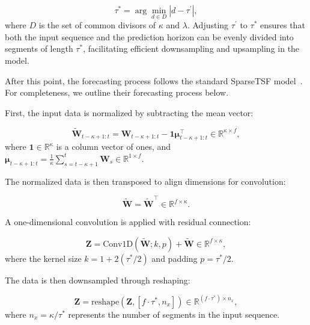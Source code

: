 \documentclass{ieeetmlcn}
\begin{document}
\begin{equation}
\label{eq:tau_adjust}
\tau^{\ast} = \arg\min_{d \in D} \left| d - \tau^\prime \right|,
\end{equation}
where $D$ is the set of common divisors of $\kappa$ and $\lambda$. Adjusting $\tau^\prime$ to $\tau^{\ast}$ ensures that both the input sequence and the prediction horizon can be evenly divided into segments of length $\tau^{\ast}$, facilitating efficient downsampling and upsampling in the model.

After this point, the forecasting process follows the standard SparseTSF model~\cite{sparseTSF}. For completeness, we outline their forecasting process below.

First, the input data is normalized by subtracting the mean vector:

\begin{equation}
\label{eq:normalization}
\tilde{\mathbf{W}}_{t-\kappa+1:t} = \mathbf{W}_{t-\kappa+1:t} - \mathbf{1} \boldsymbol{\mu}_{t-\kappa+1:t}^\top \in \mathbb{R}^{\kappa \times f},
\end{equation}
where $\mathbf{1} \in \mathbb{R}^{\kappa}$ is a column vector of ones, and $\boldsymbol{\mu}_{t-\kappa+1:t} = \frac{1}{\kappa} \sum_{s=t-\kappa+1}^{t} \mathbf{W}_{s} \in \mathbb{R}^{1 \times f}$.

The normalized data is then transposed to align dimensions for convolution:

\begin{equation}
\label{eq:permutation}
\tilde{\mathbf{W}} = \tilde{\mathbf{W}}^\top \in \mathbb{R}^{f \times \kappa}.
\end{equation}

A one-dimensional convolution is applied with residual connection:

\begin{equation}
\label{eq:convolution}
\mathbf{Z} = \text{Conv1D}\left( \tilde{\mathbf{W}}; k,  p \right) + \tilde{\mathbf{W}} \in \mathbb{R}^{f \times \kappa},
\end{equation}
where the kernel size $k = 1 + 2(\tau^{\ast}/2)$ and padding $p = \tau^{\ast}/2$.

The data is then downsampled through reshaping:

\begin{equation}
\label{eq:downsampling}
\mathbf{Z} = \text{reshape}\left( \mathbf{Z},  \left[ f \cdot \tau^{\ast},  n_x \right] \right) \in \mathbb{R}^{(f \cdot \tau^{\ast}) \times n_x},
\end{equation}
where $n_x = \kappa / \tau^{\ast}$ represents the number of segments in the input sequence.
\end{document}
